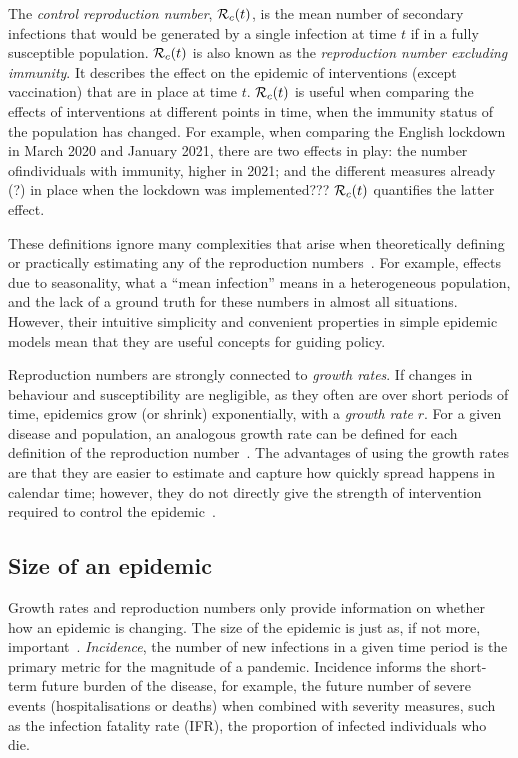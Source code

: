 \documentclass[thesis.tex]{subfiles}
\begin{document}
The \emph{control reproduction number}, $\mathcal{R}_{c}(t)$, is the mean number of secondary infections that would be generated by a single infection at time $t$ if in a fully susceptible population.
$\mathcal{R}_{c}(t)$ is also known as the \emph{reproduction number excluding immunity}.
It describes the effect on the epidemic of interventions (except vaccination) that are in place at time $t$.
$\mathcal{R}_{c}(t)$ is useful when comparing the effects of interventions at different points in time, when the immunity status of the population has changed.
For example, when comparing the English lockdown in March 2020 and January 2021, there are two effects in play: the number ofindividuals with immunity, higher in 2021; and the different measures already (?) in place when the lockdown was implemented???
$\mathcal{R}_{c}(t)$ quantifies the latter effect.

These definitions ignore many complexities that arise when theoretically defining or practically estimating any of the reproduction numbers~\autocite{pellisEstimation}.
For example, effects due to seasonality, what a ``mean infection'' means in a heterogeneous population, and the lack of a ground truth for these numbers in almost all situations.
However, their intuitive simplicity and convenient properties in simple epidemic models mean that they are useful concepts for guiding policy.

Reproduction numbers are strongly connected to \emph{growth rates}.
If changes in behaviour and susceptibility are negligible, as they often are over short periods of time, epidemics grow (or shrink) exponentially, with a \emph{growth rate} $r$.
For a given disease and population, an analogous growth rate can be defined for each definition of the reproduction number~\autocite{pellisEstimation,paragGrowthRates,wallingaGI}.
The advantages of using the growth rates are that they are easier to estimate and capture how quickly spread happens in calendar time; however, they do not directly give the strength of intervention required to control the epidemic~\autocite{royalSocietyRnumber}.

\subsection{Size of an epidemic}

Growth rates and reproduction numbers only provide information on whether how an epidemic is changing.
The size of the epidemic is just as, if not more, important~\autocite{pellisEstimation}.
\emph{Incidence}, the number of new infections in a given time period  is the primary metric for the magnitude of a pandemic.
Incidence informs the short-term future burden of the disease, for example, the future number of severe events (hospitalisations or deaths) when combined with severity measures, such as the infection fatality rate (IFR), the proportion of infected individuals who die.
\end{document}

